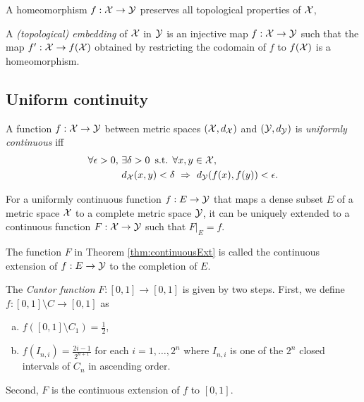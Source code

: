 \begin{coro}
  A homeomorphism $f:{\cal X}\rightarrow {\cal Y}$
  preserves all topological properties of ${\cal X}$,
\end{coro}

\begin{defn}
  A \emph{(topological) embedding} of ${\cal X}$ in ${\cal Y}$
  is an injective map $f:{\cal X}\rightarrow{\cal Y}$
  such that the map $f':{\cal X}\rightarrow f({\cal X})$
  obtained by restricting the codomain of $f$ to $f({\cal X})$
  is a homeomorphism.
\end{defn}


\subsection{Uniform continuity}

\begin{defn}
  \label{def:uniformlyContinuousMetricSpace}
  A function $f: {\cal X} \rightarrow {\cal Y}$ between
  metric spaces $({\cal X},d_{\cal X})$ and $({\cal Y}, d_{\cal Y})$ 
  is \emph{uniformly continuous}
  iff
  \begin{align}
    \label{eq:uniformlyContinuousMetricSpace}
    \forall \epsilon>0,\
    & \exists \delta>0\, \text{ s.t. }
      \forall x,y \in {\cal X},\ \
    \\ \nonumber
    &d_{\cal X}(x,y)<\delta\ \Rightarrow\ d_{\cal Y}(f(x),f(y))<\epsilon.
  \end{align}
\end{defn}



\begin{thm}
  \label{thm:continuousExt}
  For a uniformly continuous function $f: E \rightarrow {\cal Y}$ 
  that maps a dense subset $E$ of a metric space ${\cal X}$
  to a complete metric space ${\cal Y}$, 
  it can be uniquely extended to a continuous function
  $F: {\cal X}\rightarrow {\cal Y}$ such that
  $F|_{E} = f$.
\end{thm}


\begin{defn}
  \label{def:continuousExt}
  The function $F$ in Theorem \ref{thm:continuousExt}
  is called the continuous extension of $f:E\rightarrow {\cal Y}$
  to the completion of $E$.
\end{defn}

\begin{defn}
  \label{def:CantorFunction}
  The \emph{Cantor function} $F:[0,1]\rightarrow[0,1]$
  is given by two steps.
  First, we define $f:[0,1]\setminus C \rightarrow[0,1]$
  as
  \begin{enumerate}[(a)]\itemsep0em
  \item %
    $f([0,1]\setminus C_1)=\frac{1}{2}$,
  \item $f(I_{n,i})=\frac{2i-1}{2^{n+1}}$
    for each $i=1,\ldots,2^n$
    where $I_{n,i}$ is one of the $2^{n}$ closed intervals
    of $C_n$ in ascending order.
  \end{enumerate}
  Second, $F$ is the continuous extension of $f$
  to $[0,1]$. 
\end{defn}

